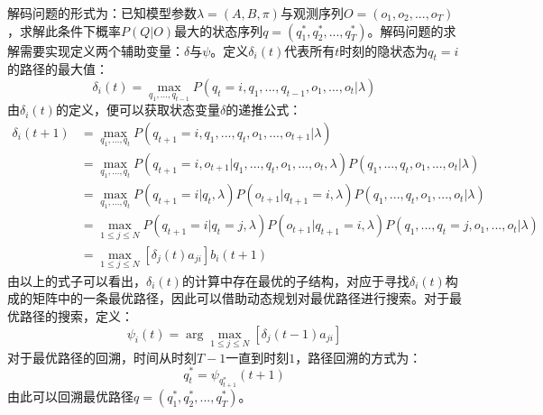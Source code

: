 \documentclass[UTF8, 12pt]{ctexart}
\begin{document}
	解码问题的形式为：已知模型参数$\lambda = (A, B, \pi)$与观测序列$O=(o_{1}, o_{2},..., o_{T})$，求解此条件下概率$P(Q|O)$最大的状态序列$q=(q_{1}^{*}, q_{2}^{*}, ..., q_{T}^{*})$。解码问题的求解需要实现定义两个辅助变量：$\delta$与$\psi$。定义$\delta_{i}(t)$代表所有$t$时刻的隐状态为$q_{t}=i$的路径的最大值：
	\begin{equation}
		\delta_{i}(t) = \max_{q_{1},...,q_{t-1}} P(q_{t}=i, q_{1}, ..., q_{t-1}, o_{1}, ..., o_{t}|\lambda)
	\end{equation}
	由$\delta_{i}(t)$的定义，便可以获取状态变量$\delta$的递推公式：
	\begin{align}
		\delta_{i}(t+1) & = \max_{q_{1},...,q_{t}} P(q_{t+1}=i, q_{1}, ..., q_{t}, o_{1}, ..., o_{t+1}|\lambda) \\
						& = \max_{q_{1},...,q_{t}} P(q_{t+1}=i, o_{t+1}|q_{1}, ..., q_{t}, o_{1}, ..., o_{t}, \lambda) P(q_{1}, ..., q_{t}, o_{1}, ...,
						o_{t}|\lambda) \\
						& = \max_{q_{1},...,q_{t}} P(q_{t+1}=i|q_{t}, \lambda) P(o_{t+1}|q_{t+1}=i, \lambda) P(q_{1}, ..., q_{t}, o_{1}, ..., o_{t}|\lambda) \\
						& = \max_{1\leq j \leq N} P(q_{t+1}=i|q_{t}=j, \lambda) P(o_{t+1}|q_{t+1}=i, \lambda) P(q_{1}, ..., q_{t}=j, o_{1}, ..., o_{t}|\lambda) \\
						& = \max_{1\leq j \leq N} [\delta_{j}(t)a_{ji}]b_{i}(t+1)
	\end{align}
	由以上的式子可以看出，$\delta_{i}(t)$的计算中存在最优的子结构，对应于寻找$\delta_{i}(t)$构成的矩阵中的一条最优路径，因此可以借助动态规划对最优路径进行搜索。对于最优路径的搜索，定义：
	\begin{equation}
		\psi_{i}(t) = \arg \max_{1\leq j \leq N} [\delta_{j}(t-1)a_{ji}]
	\end{equation}
	对于最优路径的回溯，时间从时刻$T-1$一直到时刻$1$，路径回溯的方式为：
	\begin{equation}
		q_{t}^{*} = \psi_{q_{t+1}^{*}}(t+1)
	\end{equation}
	由此可以回溯最优路径$q=(q_{1}^{*}, q_{2}^{*}, ..., q_{T}^{*})$。
	
\end{document}
